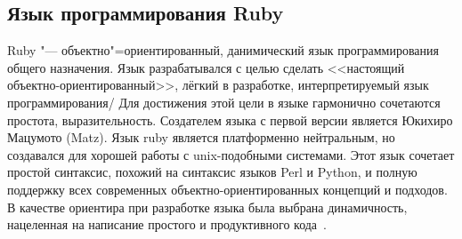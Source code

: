 \subsection{Язык программирования Ruby}
\label{sub:practice:ruby_overview}
Ruby "--- объектно"=ориентированный, данимический язык программирования общего назначения\cite{ruby_site}.
Язык разрабатывался с целью сделать <<настоящий объектно-ориентированный>>, лёгкий в разработке, интерпретируемый язык программирования/
Для достижения этой цели в языке гармонично сочетаются простота, выразительность.
Создателем языка с первой версии является  Юкихиро Мацумото (Matz).
Язык ruby является платформенно нейтральным, но создавался для хорошей работы с unix-подобными системами.
Этот язык сочетает простой синтаксис, похожий на синтаксис языков Perl и Python, и полную поддержку всех современных объектно-ориентированных концепций и подходов. В качестве ориентира при разработке языка была выбрана динамичность, нацеленная на написание простого и продуктивного кода~\cite{trpr_2011_ru}.

